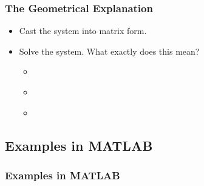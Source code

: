 \documentclass[fleqn]{beamer} %
\newcommand{\sectionIItitle}{}
\newcommand{\sectionIsubsectionIIItitle}{The Geometrical Explanation}
\newcommand{\sectionIsubsectionIVtitle}{Examples in MATLAB}
\begin{document}
			\begin{frame} 
				\frametitle{\sectionIsubsectionIIItitle}
				\bigskip
	
				\begin{itemize}
		
					\item Cast the system into matrix form. \vspace{10mm}
			
					\item Solve the system. What exactly does this mean?\\
					\begin{itemize}
						\item \hspace{10mm} \\
						\item \hspace{10mm} \\
						\item \hspace{10mm} \\
					\end{itemize}
		
				\end{itemize}
			
				\btVFill
			\end{frame}	



		\subsection{\sectionIsubsectionIVtitle}\label{sectionIsubsectionIV}	

			\begin{frame}
				\frametitle{\sectionIsubsectionIVtitle}
				\bigskip


				\btVFill
			\end{frame}
	
	\section{\sectionIItitle}\label{sectionII}
\end{document}
